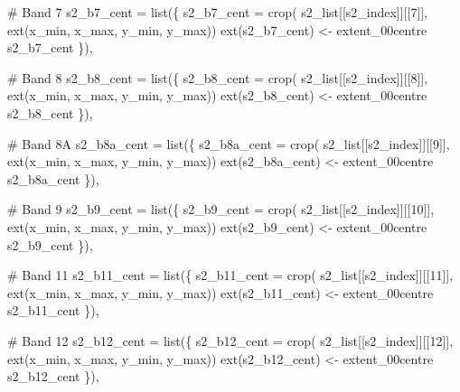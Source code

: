 \documentclass[
  letterpaper,
  DIV=11,
  numbers=noendperiod]{scrartcl}
\newenvironment{Shaded}{\begin{snugshade}}{\end{snugshade}}
\newcommand{\AttributeTok}[1]{\textcolor[rgb]{0.40,0.45,0.13}{#1}}
\newcommand{\CommentTok}[1]{\textcolor[rgb]{0.37,0.37,0.37}{#1}}
\newcommand{\DecValTok}[1]{\textcolor[rgb]{0.68,0.00,0.00}{#1}}
\newcommand{\FunctionTok}[1]{\textcolor[rgb]{0.28,0.35,0.67}{#1}}
\newcommand{\NormalTok}[1]{\textcolor[rgb]{0.00,0.23,0.31}{#1}}
\newcommand{\OtherTok}[1]{\textcolor[rgb]{0.00,0.23,0.31}{#1}}
\begin{document}
\begin{Shaded}
\begin{Highlighting}[]
    \CommentTok{\# Band 7}
    \AttributeTok{s2\_b7\_cent =} \FunctionTok{list}\NormalTok{(\{}
\NormalTok{      s2\_b7\_cent }\OtherTok{=} \FunctionTok{crop}\NormalTok{( s2\_list[[s2\_index]][[}\DecValTok{7}\NormalTok{]], }\FunctionTok{ext}\NormalTok{(x\_min, x\_max, y\_min, y\_max))}
      \FunctionTok{ext}\NormalTok{(s2\_b7\_cent) }\OtherTok{\textless{}{-}}\NormalTok{ extent\_00centre}
\NormalTok{      s2\_b7\_cent}
\NormalTok{      \}),}
    
    \CommentTok{\# Band 8}
    \AttributeTok{s2\_b8\_cent =} \FunctionTok{list}\NormalTok{(\{}
\NormalTok{      s2\_b8\_cent }\OtherTok{=} \FunctionTok{crop}\NormalTok{( s2\_list[[s2\_index]][[}\DecValTok{8}\NormalTok{]], }\FunctionTok{ext}\NormalTok{(x\_min, x\_max, y\_min, y\_max))}
      \FunctionTok{ext}\NormalTok{(s2\_b8\_cent) }\OtherTok{\textless{}{-}}\NormalTok{ extent\_00centre}
\NormalTok{      s2\_b8\_cent}
\NormalTok{      \}),}
    
    \CommentTok{\# Band 8A}
    \AttributeTok{s2\_b8a\_cent =} \FunctionTok{list}\NormalTok{(\{}
\NormalTok{      s2\_b8a\_cent }\OtherTok{=} \FunctionTok{crop}\NormalTok{( s2\_list[[s2\_index]][[}\DecValTok{9}\NormalTok{]], }\FunctionTok{ext}\NormalTok{(x\_min, x\_max, y\_min, y\_max))}
      \FunctionTok{ext}\NormalTok{(s2\_b8a\_cent) }\OtherTok{\textless{}{-}}\NormalTok{ extent\_00centre}
\NormalTok{      s2\_b8a\_cent}
\NormalTok{      \}),}
    
    \CommentTok{\# Band 9}
    \AttributeTok{s2\_b9\_cent =} \FunctionTok{list}\NormalTok{(\{}
\NormalTok{      s2\_b9\_cent }\OtherTok{=} \FunctionTok{crop}\NormalTok{( s2\_list[[s2\_index]][[}\DecValTok{10}\NormalTok{]], }\FunctionTok{ext}\NormalTok{(x\_min, x\_max, y\_min, y\_max))}
      \FunctionTok{ext}\NormalTok{(s2\_b9\_cent) }\OtherTok{\textless{}{-}}\NormalTok{ extent\_00centre}
\NormalTok{      s2\_b9\_cent}
\NormalTok{      \}),}
    
    \CommentTok{\# Band 11}
    \AttributeTok{s2\_b11\_cent =} \FunctionTok{list}\NormalTok{(\{}
\NormalTok{      s2\_b11\_cent }\OtherTok{=} \FunctionTok{crop}\NormalTok{( s2\_list[[s2\_index]][[}\DecValTok{11}\NormalTok{]], }\FunctionTok{ext}\NormalTok{(x\_min, x\_max, y\_min, y\_max))}
      \FunctionTok{ext}\NormalTok{(s2\_b11\_cent) }\OtherTok{\textless{}{-}}\NormalTok{ extent\_00centre}
\NormalTok{      s2\_b11\_cent}
\NormalTok{      \}),}
    
    \CommentTok{\# Band 12}
    \AttributeTok{s2\_b12\_cent =} \FunctionTok{list}\NormalTok{(\{}
\NormalTok{      s2\_b12\_cent }\OtherTok{=} \FunctionTok{crop}\NormalTok{( s2\_list[[s2\_index]][[}\DecValTok{12}\NormalTok{]], }\FunctionTok{ext}\NormalTok{(x\_min, x\_max, y\_min, y\_max))}
      \FunctionTok{ext}\NormalTok{(s2\_b12\_cent) }\OtherTok{\textless{}{-}}\NormalTok{ extent\_00centre}
\NormalTok{      s2\_b12\_cent}
\NormalTok{      \}),}


\end{Highlighting}
\end{Shaded}
\end{document}
